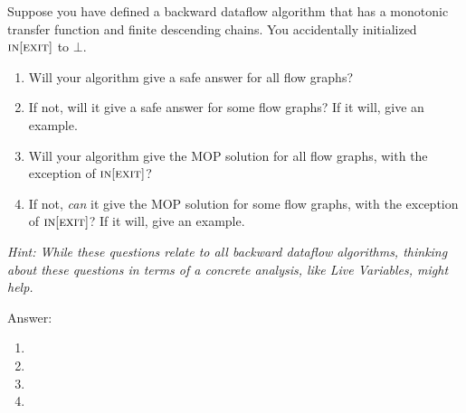\begin{problem}
\begin{problempart}
\end{problempart}

\pagebreak

\begin{problempart}
	Suppose you have defined a backward dataflow algorithm that has a monotonic transfer function and finite descending chains. You accidentally initialized $\textsc{in}[\textsc{exit}]$ to $\bot$.
	\begin{enumerate}
		\item Will your algorithm give a safe answer for all flow graphs?
		\item If not, will it give a safe answer for some flow graphs? If it will, give an example.
		\item Will your algorithm give the MOP solution for all flow graphs, with the exception of $\textsc{in}[\textsc{exit}]$?
		\item If not, \emph{can} it give the MOP solution for some flow graphs, with the exception of $\textsc{in}[\textsc{exit}]$? If it will, give an
		      example.
	\end{enumerate}
	\emph{Hint: While these questions relate to \emph{all} backward dataflow algorithms, thinking about these questions in terms of a concrete analysis, like Live Variables, might help.}

	\item Answer:
	\begin{enumerate}
		\item {\color{red}{Yes. Run the iterative algorithm with the correct initial values and the modified initial
			      values in parallel. At each iteration, by monotonicity of $f$, the values at each node in
			      the modified run will remain $\leq$ that in the correct run. Do not stop until both runs
			      reach FP (the run converged first will just remain its fixed results). Then by induction,
			      when both algorithms stop, the values under the modified algorithm (Modified-FP)
			      will still be $\leq$ the FP values under the correct algorithm (MFP). And since we know
			      MFP $\leq$ IDEAL, we have Modified-FP $\leq$ IDEAL as well.}}
		\item {\color{red}{No.}}
		\item {\color{red}{No. Any nontrivial example would act as a counterexample.}}
		\item {\color{red}{Just take the liveness analysis for example.}}
	\end{enumerate}

\end{problempart}
\end{problem}

